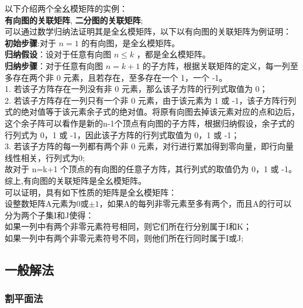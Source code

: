 \documentclass[11pt]{ctexart}
\begin{document}
以下介绍两个全幺模矩阵的实例：\\
\textbf{有向图的关联矩阵},
\textbf{二分图的关联矩阵};\\

可以通过数学归纳法证明其是全幺模矩阵，以下以有向图的关联矩阵为例证明：\\

\textbf{初始步骤}:对于 $n=1$ 的有向图，是全幺模矩阵。\\

\textbf{归纳假设}：设对于任意有向图 $n \leq k$ ，都是全幺模矩阵。\\

\textbf{归纳步骤}：对于任意有向图 $n=k+1$ 的子方阵，根据关联矩阵的定义，每一列至多存在两个非 0 元素，且若存在，至多存在一个 1，一个 -1。\\

1. 若该子方阵存在一列没有非 0 元素，那么该子方阵的行列式取值为 0；\\

2. 若该子方阵存在一列只有一个非 0 元素，由于该元素为 1 或 -1，该子方阵行列式的绝对值等于该元素余子式的绝对值。将原有向图去掉该元素对应的点和边后，这个余子阵可以看作是新的n-1个顶点有向图的子方阵，根据归纳假设，余子式的行列式为 0，1 或 -1，因此该子方阵的行列式取值为 0，1 或 -1；\\

3. 若该子方阵的每一列都有两个非 0 元素，对行进行累加得到零向量，即行向量线性相关，行列式为0;\\

故对于 n=k+1 个顶点的有向图的任意子方阵，其行列式的取值仍为 0，1 或 -1。\\

综上,有向图的关联矩阵是全幺模矩阵。\\


可以证明，具有如下性质的矩阵是全幺模矩阵：\\

设整数矩阵A元素为$0$或$\pm 1$，如果A的每列非零元素至多有两个，而且A的行可以分为两个子集I和J使得：\\
如果一列中有两个非零元素符号相同，则它们所在行分别属于I和K；\\
如果一列中有两个非零元素符号不同，则他们所在行同时属于I或J;\\


\subsection{一般解法}
\subsubsection{割平面法}
\end{document}
